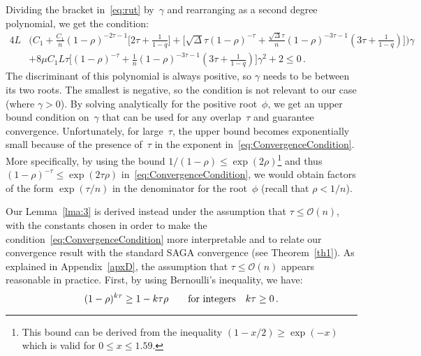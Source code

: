 \documentclass[twoside]{article}
\newcommand{\stepsize}{\gamma}
\newcommand{\strongconvex}{\mu}
\newcommand{\overlap}{\tau}
\newcommand{\contraction}{\rho}
\newcommand{\sparsity}{\Delta}
\newcommand{\lipschitz}{L}
\begin{document}
Dividing the bracket in~\eqref{eq:rut} by~$\stepsize$ and rearranging as a second degree polynomial, we get the condition:
\begin{align} 
4\lipschitz &\Bigg(
	C_1 
	+ \frac{C_1}{n}(1-\contraction)^{-2\overlap -1}\Big[2\overlap + \frac{1}{1-q}\Big]
	+ \Big[\sqrt{\sparsity}\overlap(1-\contraction)^{-\overlap} + \frac{\sqrt{\sparsity}\overlap}{n}(1 -\contraction)^{-3\overlap -1}(3\overlap + \frac{1}{1 -q}) \Big]
	\Bigg) \stepsize
\nonumber \\
	&+ 8\strongconvex C_1 \lipschitz \overlap \Big[(1-\contraction)^{-\overlap} + \frac{1}{n}(1 -\contraction)^{-3\overlap -1}(3\overlap + \frac{1}{1 -q})
	\Big] \stepsize^2
	+ 2
\leq 0  \, . \label{eq:ConvergenceCondition}
\end{align}
The discriminant of this polynomial is always positive, so $\stepsize$ needs to be between its two roots. 
The smallest is negative, so the condition is not relevant to our case (where $\stepsize > 0$). 
By solving analytically for the positive root~$\phi$, we get an upper bound condition on~$\stepsize$ that can be used for any overlap~$\overlap$ and guarantee convergence. 
Unfortunately, for large~$\overlap$, the upper bound becomes exponentially small because of the presence of~$\overlap$ in the exponent in~\eqref{eq:ConvergenceCondition}. 
More specifically, by using the bound $1/(1-\contraction) \leq \exp(2\contraction)$\footnote{This bound can be derived from the inequality $(1-x/2) \geq \exp(-x)$ which is valid for $0 \leq x \leq 1.59$.} and thus $(1-\contraction)^{-\overlap} \leq \exp(2 \overlap \contraction)$ in~\eqref{eq:ConvergenceCondition}, we would obtain factors of the form $\exp(\overlap/n)$ in the denominator for the root~$\phi$ (recall that $\contraction < 1/n$). 

Our Lemma~\ref{lma:3} is derived instead under the assumption that $\overlap \leq \mathcal{O}(n)$, with the constants chosen in order to make the condition~\eqref{eq:ConvergenceCondition} more interpretable and to relate our convergence result with the standard SAGA convergence (see Theorem~\ref{th1}). As explained in Appendix~\ref{apxD}, the assumption that $\overlap \leq \mathcal{O}(n)$ appears reasonable in practice. 
First, by using Bernoulli's inequality, we have:
\begin{equation} \label{eq:Bernouilli}
(1 - \contraction)^{k \overlap} \geq 1 - k\overlap \contraction \qquad \textnormal{for integers} \quad k\overlap \geq 0 \, .
\end{equation}
\end{document}
